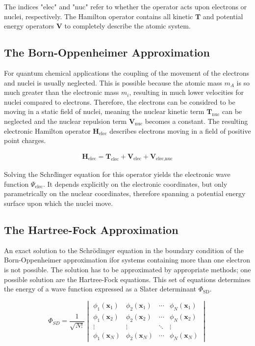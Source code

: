 The indices "elec" and "nuc" refer to whether the operator acts upon electrons
or nuclei, respectively. The Hamilton operator contains all kinetic
$\mathbf{T}$ and potential energy operators $\mathbf{V}$ to completely describe
the atomic system.

\subsection{The Born-Oppenheimer Approximation}

For quantum chemical applications the coupling of the movement of the electrons
and nuclei is usually neglected. This is possible because the atomic mass $m_A$
is so much greater than the electronic mass $m_i$, resulting in much lower
velocities for nuclei compared to electrons. Therefore, the electrons can be
considred to be moving in a static field of nuclei, meaning the nuclear kinetic
term $\mathbf{T}_\text{nuc}$ can be neglected and the nuclear repulsion term
$\mathbf{V}_\text{nuc}$ becomes a constant. The resulting electronic Hamilton
operator $\mathbf{H}_\text{elec}$ describes electrons moving in a field of
positive point charges.

\begin{align}
    \mathbf{H}_\text{elec}=\mathbf{T}_\text{elec} + \mathbf{V}_\text{elec} + \mathbf{V}_\text{elec,nuc}
\end{align}

Solving the Schr\"dinger equation for this operator yields the electronic wave
function $\Psi_\text{elec}$. It depends explicitly on the electronic
coordinates, but only parametrically on the nuclear coordinates, therefore
spanning a potential energy surface upon which the nuclei move.

\subsection{The Hartree-Fock Approximation}

An exact solution to the Schr\"odinger equation in the boundary condition of
the Born-Oppenheimer approximation ifor systems containing more than one
electron is not possible. The solution has to be approximated by appropriate
methods; one possible solution are the Hartree-Fock equations. This set of
equations determines the energy of a wave function expressed as a Slater
determinant $\Phi_\text{SD}$.

\begin{equation}
     \Phi_{SD}=\frac{1}{\sqrt{N!}}
     \begin{vmatrix}
         \phi_1(\mathbf{x}_1) & \phi_2(\mathbf{x}_1) & \cdots & \phi_N(\mathbf{x}_1)\\
         \phi_1(\mathbf{x}_2) & \phi_2 (\mathbf{x}_2) & \cdots & \phi_N(\mathbf{x}_2)\\
         \vdots & \vdots & \ddots & \vdots\\
         \phi_1(\mathbf{x}_N) & \phi_2(\mathbf{x}_N) & \cdots & \phi_N(\mathbf{x}_N)
     \end{vmatrix}
     \label{eqn:SlaterDet}
\end{equation}

